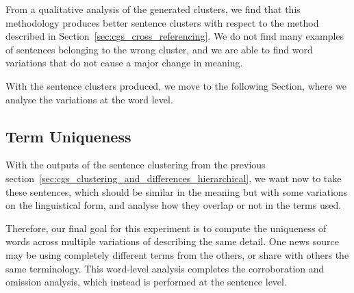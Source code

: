 

From a qualitative analysis of the generated clusters, we find that this methodology produces better sentence clusters with respect to the method described in Section~\ref{sec:cgs_cross_referencing}.
We do not find many examples of sentences belonging to the wrong cluster, and we are able to find word variations that do not cause a major change in meaning.

With the sentence clusters produced, we move to the following Section, where we analyse the variations at the word level.

\subsection{\statusgreen Term Uniqueness}
\label{sec:cgs_clustering_and_differences_uniqueness}

With the outputs of the sentence clustering from the previous section~\ref{sec:cgs_clustering_and_differences_hierarchical}, we want now to take these sentences, which should be similar in the meaning but with some variations on the linguistical form, and analyse how they overlap or not in the terms used.

Therefore, our final goal for this experiment is to compute the uniqueness of words across multiple variations of describing the same detail.
One news source may be using completely different terms from the others, or share with others the same terminology.
This word-level analysis completes the corroboration and omission analysis, which instead is performed at the sentence level.

